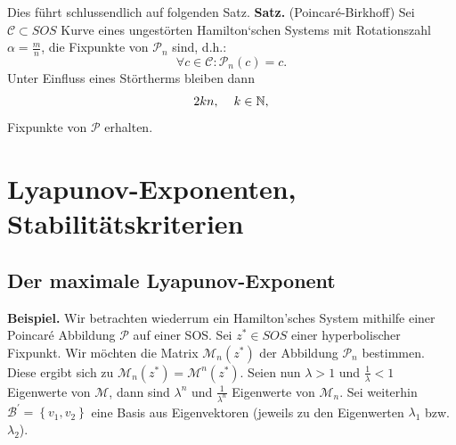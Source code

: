 \documentclass[11pt,a4paper]{article}
\begin{document}
Dies führt schlussendlich auf folgenden Satz.
\newline
\newline
\textbf{Satz.} (Poincar\'{e}-Birkhoff) Sei $ \mathcal{C} \subset SOS $ Kurve eines ungestörten Hamilton`schen Systems mit Rotationszahl $ \alpha = \frac{m}{n} $, die Fixpunkte von $ \mathcal{P}_n $ sind, d.h.:\[ \forall c \in \mathcal{C}: \mathcal{P}_n(c) = c.\] Unter Einfluss eines Störtherms bleiben dann \[ 2kn, \hspace{0.4cm} k \in \mathbb{N}, \] Fixpunkte von $ \mathcal{P} $ erhalten.



\section{Lyapunov-Exponenten, Stabilitätskriterien}

\subsection{Der maximale Lyapunov-Exponent}

\textbf{Beispiel.} Wir betrachten wiederrum ein Hamilton'sches System mithilfe einer Poincar\'{e} Abbildung $ \mathcal{P} $ auf einer SOS. Sei $ z^* \in SOS $ einer hyperbolischer Fixpunkt. Wir möchten die Matrix $ \mathcal{M}_{n}(z^*) $ der Abbildung $ \mathcal{P}_n $ bestimmen. Diese ergibt sich zu $ \mathcal{M}_n(z^*) = \mathcal{M}^n (z^*) $. Seien nun $ \lambda > 1 $ und $ \frac{1}{\lambda} < 1  $ Eigenwerte von $ \mathcal{M} $, dann sind $ \lambda^n $ und $ \frac{1}{\lambda^n} $ Eigenwerte von $ \mathcal{M}_n $. Sei weiterhin $ \mathcal{B}^{'} = \left\lbrace v_1,v_2 \right\rbrace  $ eine Basis aus Eigenvektoren (jeweils zu den Eigenwerten $ \lambda_1 $ bzw. $ \lambda_2 $).
\end{document}
